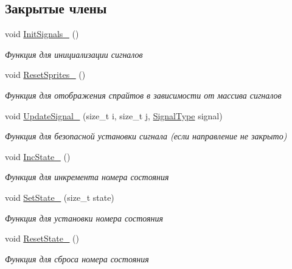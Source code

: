 \subsection*{Закрытые члены}
\begin{DoxyCompactItemize}
\item 
\mbox{\label{classrtm_1_1_control_unit_aeec72cf989ee126e9fb7a7b27c486f6b}} 
void \hyperlink{classrtm_1_1_control_unit_aeec72cf989ee126e9fb7a7b27c486f6b}{Init\+Signals\+\_\+} ()
\begin{DoxyCompactList}\small\item\em Функция для инициализации сигналов \end{DoxyCompactList}\item 
\mbox{\label{classrtm_1_1_control_unit_aca3d0de2c18e1b9fa1ca449e86328599}} 
void \hyperlink{classrtm_1_1_control_unit_aca3d0de2c18e1b9fa1ca449e86328599}{Reset\+Sprites\+\_\+} ()
\begin{DoxyCompactList}\small\item\em Функция для отображения спрайтов в зависимости от массива сигналов \end{DoxyCompactList}\item 
void \hyperlink{classrtm_1_1_control_unit_afacb521a6f7297b932a48edbbf0a10b2}{Update\+Signal\+\_\+} (size\+\_\+t i, size\+\_\+t j, \hyperlink{namespacertm_aadb7300c15d57429546fb0b7f8ee0ee6}{Signal\+Type} signal)
\begin{DoxyCompactList}\small\item\em Функция для безопасной установки сигнала (если направление не закрыто) \end{DoxyCompactList}\item 
\mbox{\label{classrtm_1_1_control_unit_a63302a181e4f6cf8ecfc9acd24acfdb9}} 
void \hyperlink{classrtm_1_1_control_unit_a63302a181e4f6cf8ecfc9acd24acfdb9}{Inc\+State\+\_\+} ()
\begin{DoxyCompactList}\small\item\em Функция для инкремента номера состояния \end{DoxyCompactList}\item 
void \hyperlink{classrtm_1_1_control_unit_adc15ad500c2e7edbe9bdac16a16a0eff}{Set\+State\+\_\+} (size\+\_\+t state)
\begin{DoxyCompactList}\small\item\em Функция для установки номера состояния \end{DoxyCompactList}\item 
\mbox{\label{classrtm_1_1_control_unit_a8beeca4f58525c029a5879534304367e}} 
void \hyperlink{classrtm_1_1_control_unit_a8beeca4f58525c029a5879534304367e}{Reset\+State\+\_\+} ()
\begin{DoxyCompactList}\small\item\em Функция для сброса номера состояния \end{DoxyCompactList}\end{DoxyCompactItemize}
